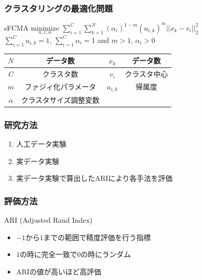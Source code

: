 \documentclass[13pt,dvipdfmx]{beamer}
\begin{document}
\begin{frame}\frametitle{クラスタリングの最適化問題}
  \begin{block}{sFCMA}
    \quad$\underset{u,v,\alpha}{\text{minimize}}$
    $\sum_{i=1}^C\sum_{k=1}^N(\alpha_{i})^{1-m}(u_{i,k})^m||x_k-v_i||_2^2$\\
    \qquad\qquad{}$\sum_{i=1}^Cu_{i,k}=1$\;, \;$\sum_{i=1}^C\alpha_{i}=1$\; and \;$m>1$\;, \;$\alpha_{i}>0$
  \end{block}
  \begin{center}
    \begin{tabular}{c|c||c|c} \hline
	  {$N$}&データ数&{$x_k$}&データ数 \\ \hline
	  {$C$}&クラスタ数&{$v_i$}&クラスタ中心\\ \hline
	  {$m$}&ファジィ化パラメータ&{$u_{i,k}$}&帰属度 \\ \hline
	  {$\alpha$}&クラスタサイズ調整変数\\ \hline
    \end{tabular}
  \end{center}
\end{frame}

\begin{frame}\frametitle{研究方法}
  \begin{enumerate}
  \item 人工データ実験
  \item 実データ実験
  \item 実データ実験で算出したARIにより各手法を評価
  \end{enumerate}
\end{frame}

\begin{frame}\frametitle{評価方法}
  \begin{block}{ARI (Adjusted Rand Index)}
    \begin{itemize}
    \item $-1$から$1$までの範囲で精度評価を行う指標
    \item $1$の時に完全一致で$0$の時にランダム
    \item ARIの値が高いほど高評価
    \end{itemize}
  \end{block}
  \begin{center}
  \end{center}
\end{frame}
\end{document}
